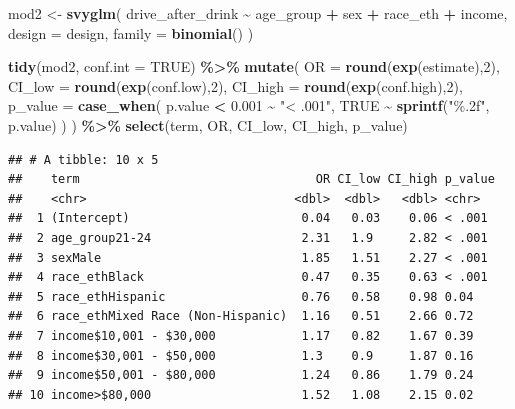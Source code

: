 \documentclass[
]{article}
\newenvironment{Shaded}{\begin{snugshade}}{\end{snugshade}}
\newcommand{\AttributeTok}[1]{\textcolor[rgb]{0.13,0.29,0.53}{#1}}
\newcommand{\ConstantTok}[1]{\textcolor[rgb]{0.56,0.35,0.01}{#1}}
\newcommand{\DecValTok}[1]{\textcolor[rgb]{0.00,0.00,0.81}{#1}}
\newcommand{\FloatTok}[1]{\textcolor[rgb]{0.00,0.00,0.81}{#1}}
\newcommand{\FunctionTok}[1]{\textcolor[rgb]{0.13,0.29,0.53}{\textbf{#1}}}
\newcommand{\NormalTok}[1]{#1}
\newcommand{\OtherTok}[1]{\textcolor[rgb]{0.56,0.35,0.01}{#1}}
\newcommand{\SpecialCharTok}[1]{\textcolor[rgb]{0.81,0.36,0.00}{\textbf{#1}}}
\newcommand{\StringTok}[1]{\textcolor[rgb]{0.31,0.60,0.02}{#1}}
\begin{document}
\begin{Shaded}
\begin{Highlighting}[]
\NormalTok{mod2 }\OtherTok{\textless{}{-}} \FunctionTok{svyglm}\NormalTok{(}
\NormalTok{  drive\_after\_drink }\SpecialCharTok{\textasciitilde{}}\NormalTok{ age\_group }\SpecialCharTok{+}\NormalTok{ sex }\SpecialCharTok{+}\NormalTok{ race\_eth }\SpecialCharTok{+}\NormalTok{ income,}
  \AttributeTok{design =}\NormalTok{ design,}
  \AttributeTok{family =} \FunctionTok{binomial}\NormalTok{()}
\NormalTok{) }

\FunctionTok{tidy}\NormalTok{(mod2, }\AttributeTok{conf.int =} \ConstantTok{TRUE}\NormalTok{) }\SpecialCharTok{\%\textgreater{}\%}
  \FunctionTok{mutate}\NormalTok{(}
    \AttributeTok{OR =} \FunctionTok{round}\NormalTok{(}\FunctionTok{exp}\NormalTok{(estimate),}\DecValTok{2}\NormalTok{),}
    \AttributeTok{CI\_low =} \FunctionTok{round}\NormalTok{(}\FunctionTok{exp}\NormalTok{(conf.low),}\DecValTok{2}\NormalTok{),}
    \AttributeTok{CI\_high =} \FunctionTok{round}\NormalTok{(}\FunctionTok{exp}\NormalTok{(conf.high),}\DecValTok{2}\NormalTok{),}
    \AttributeTok{p\_value =} \FunctionTok{case\_when}\NormalTok{(}
\NormalTok{      p.value }\SpecialCharTok{\textless{}} \FloatTok{0.001} \SpecialCharTok{\textasciitilde{}} \StringTok{"\textless{} .001"}\NormalTok{,}
      \ConstantTok{TRUE} \SpecialCharTok{\textasciitilde{}} \FunctionTok{sprintf}\NormalTok{(}\StringTok{"\%.2f"}\NormalTok{, p.value)}
\NormalTok{    )}
\NormalTok{  ) }\SpecialCharTok{\%\textgreater{}\%}
  \FunctionTok{select}\NormalTok{(term, OR, CI\_low, CI\_high, p\_value)}
\end{Highlighting}
\end{Shaded}

\begin{verbatim}
## # A tibble: 10 x 5
##    term                                 OR CI_low CI_high p_value
##    <chr>                             <dbl>  <dbl>   <dbl> <chr>  
##  1 (Intercept)                        0.04   0.03    0.06 < .001 
##  2 age_group21-24                     2.31   1.9     2.82 < .001 
##  3 sexMale                            1.85   1.51    2.27 < .001 
##  4 race_ethBlack                      0.47   0.35    0.63 < .001 
##  5 race_ethHispanic                   0.76   0.58    0.98 0.04   
##  6 race_ethMixed Race (Non-Hispanic)  1.16   0.51    2.66 0.72   
##  7 income$10,001 - $30,000            1.17   0.82    1.67 0.39   
##  8 income$30,001 - $50,000            1.3    0.9     1.87 0.16   
##  9 income$50,001 - $80,000            1.24   0.86    1.79 0.24   
## 10 income>$80,000                     1.52   1.08    2.15 0.02
\end{verbatim}
\end{document}

